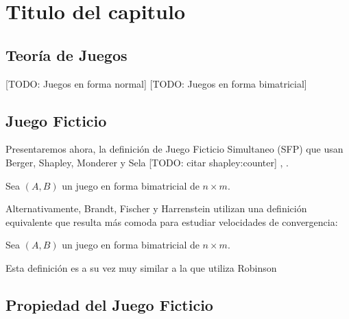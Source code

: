 \chapter{Titulo del capitulo}  \label{cap1}

\section{Teoría de Juegos}
[TODO: Juegos en forma normal]
[TODO: Juegos en forma bimatricial]

\section{Juego Ficticio}
Presentaremos ahora, la definición de Juego Ficticio Simultaneo (SFP) que usan Berger, Shapley, Monderer y Sela
\cite{browns:original} \cite{strategic:complementarities} [TODO: citar shapley:counter] \cite{no:cycling}, \cite{identical:interests}.


\begin{definition}
    Sea $(A, B)$ un juego en forma bimatricial de $n \times m$.
\end{definition}

Alternativamente, Brandt, Fischer y Harrenstein utilizan una definición equivalente que resulta más comoda para estudiar velocidades
de convergencia:

\begin{definition}
    Sea $(A, B)$ un juego en forma bimatricial de $n \times m$.
\end{definition}

Esta definición es a su vez muy similar a la que utiliza Robinson \cite{robinson:zerosum}
\section{Propiedad del Juego Ficticio}